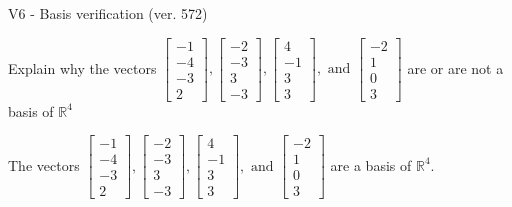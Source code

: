 \begin{exercise}
  \begin{exerciseTitle}V6 - Basis verification (ver. 572)\end{exerciseTitle}
  \begin{exerciseStatement}
    Explain why the vectors \(\left[\begin{array}{r}
-1 \\
-4 \\
-3 \\
2
\end{array}\right] , \left[\begin{array}{r}
-2 \\
-3 \\
3 \\
-3
\end{array}\right] , \left[\begin{array}{r}
4 \\
-1 \\
3 \\
3
\end{array}\right] , \text{ and } \left[\begin{array}{r}
-2 \\
1 \\
0 \\
3
\end{array}\right]\) are or are not a basis of \(\mathbb{R}^4\)	


  \end{exerciseStatement}
  \begin{exerciseAnswer}
   The vectors \(\left[\begin{array}{r}
-1 \\
-4 \\
-3 \\
2
\end{array}\right] , \left[\begin{array}{r}
-2 \\
-3 \\
3 \\
-3
\end{array}\right] , \left[\begin{array}{r}
4 \\
-1 \\
3 \\
3
\end{array}\right] , \text{ and } \left[\begin{array}{r}
-2 \\
1 \\
0 \\
3
\end{array}\right]\) 
  	 are  a basis of \(\mathbb{R}^4\).
  


  \end{exerciseAnswer}
\end{exercise}